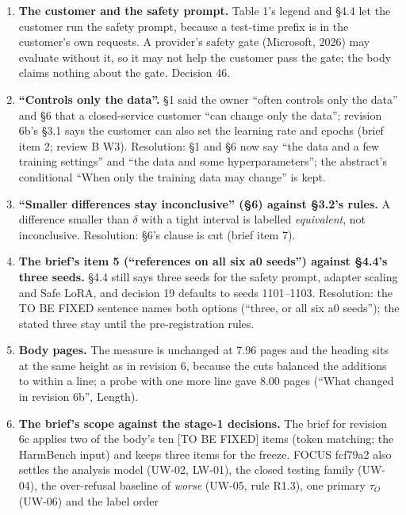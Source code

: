 \documentclass{article}
\theoremstyle{plain}
\theoremstyle{definition}
\theoremstyle{remark}
\begin{document}
\begin{enumerate}
  \item \textbf{The customer and the safety prompt.} Table 1's legend and
        \S{}4.4 let the customer run the safety prompt, because a test-time
        prefix is in the customer's own requests. A provider's safety gate
        (Microsoft, 2026) may evaluate without it, so it may not help the
        customer pass the gate; the body claims nothing about the gate. Decision
        46.
  \item \textbf{``Controls only the data''.} \S{}1 said the owner ``often
        controls only the data'' and \S{}6 that a closed-service customer ``can
        change only the data''; revision 6b's \S{}3.1 says the customer can also
        set the learning rate and epochs (brief item 2; review B W3).
        Resolution: \S{}1 and \S{}6 now say ``the data and a few training
        settings'' and ``the data and some hyperparameters''; the abstract's
        conditional ``When only the training data may change'' is kept.
  \item \textbf{``Smaller differences stay inconclusive'' (\S{}6) against
        \S{}3.2's rules.} A difference smaller than $\delta$ with a tight
        interval is labelled \emph{equivalent}, not inconclusive. Resolution:
        \S{}6's clause is cut (brief item 7).
  \item \textbf{The brief's item 5 (``references on all six a0 seeds'') against
        \S{}4.4's three seeds.} \S{}4.4 still says three seeds for the safety
        prompt, adapter scaling and Safe LoRA, and decision 19 defaults to seeds
        1101--1103. Resolution: the TO BE FIXED sentence names both options
        (``three, or all six a0 seeds''); the stated three stay until the
        pre-registration rules.
  \item \textbf{Body pages.} The measure is unchanged at 7.96 pages and the
        heading sits at the same height as in revision 6, because the cuts
        balanced the additions to within a line; a probe with one more line gave
        8.00 pages (``What changed in revision 6b'', Length).
  \item \textbf{The brief's scope against the stage-1 decisions.} The brief for
        revision 6c applies two of the body's ten [TO BE FIXED] items (token
        matching; the HarmBench input) and keeps three items for the freeze.
        FOCUS fcf79a2 also settles the analysis model (UW-02, LW-01), the closed
        testing family (UW-04), the over-refusal baseline of \emph{worse}
        (UW-05, rule R1.3), one primary $\tau_{O}$ (UW-06) and the label order

\end{enumerate}
\end{document}
